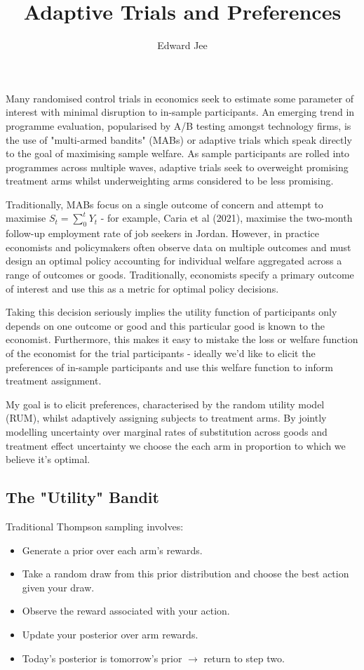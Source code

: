 \documentclass{article}
\title{Adaptive Trials and Preferences}
\author{Edward Jee}
\begin{document}
\maketitle


Many randomised control trials in economics seek to estimate some parameter of 
interest with minimal disruption to in-sample participants.  An emerging trend in programme 
evaluation, popularised by A/B testing amongst technology firms, is the use of 
"multi-armed bandits" (MABs) or adaptive trials which speak directly to the goal 
of maximising sample welfare. As sample participants are rolled into programmes 
across multiple waves, adaptive trials seek to overweight promising treatment 
arms whilst underweighting arms considered to be less promising.



Traditionally, MABs focus on a single outcome of concern and attempt to maximise 
$S_t = \sum^t_{0}Y_t$ - for example, Caria et al (2021), maximise the 
two-month follow-up employment rate of job seekers in Jordan. However, in 
practice economists and policymakers often observe data on multiple outcomes and 
must design an optimal policy accounting for individual welfare aggregated across 
a range of outcomes or goods. Traditionally, economists specify a primary outcome 
of interest and use this as a metric for optimal policy decisions. 

    
Taking this decision seriously 
implies the utility function of participants only depends on one outcome or good 
and this particular good is known to the economist. Furthermore, this makes it 
easy to mistake the loss or welfare function of the economist for the trial 
participants - ideally we'd like to elicit the preferences of in-sample participants 
and use this welfare function to inform treatment assignment. 


My goal is  to elicit preferences, characterised by the 
random utility model (RUM), whilst adaptively assigning subjects 
to treatment arms. By jointly modelling uncertainty over marginal rates of substitution 
across goods and treatment effect uncertainty we choose the each arm in proportion 
to which we believe it's optimal.

\subsection*{The "Utility" Bandit}


Traditional Thompson sampling involves:


    \begin{itemize}
        \item Generate a prior over each arm's rewards.
        \item Take a random draw from this prior distribution and choose the best action given your draw.
        \item Observe the reward associated with your action.
        \item Update your posterior over arm rewards.
        \item Today's posterior is tomorrow's prior $\rightarrow$ return to step two.
    \end{itemize}
\end{document}
